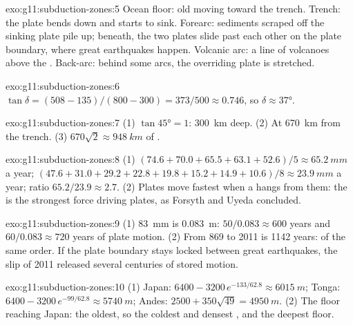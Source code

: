 \begin{solution}{exo:g11:subduction-zones:5}
Ocean floor: old  moving toward the trench. Trench: the plate bends
down and starts to sink. Forearc: sediments scraped off the sinking plate pile
up; beneath, the two plates slide past each other on the plate boundary,
where great earthquakes happen. Volcanic arc: a line of volcanoes above the
. Back-arc: behind some arcs, the overriding plate is stretched.
\end{solution}

\begin{solution}{exo:g11:subduction-zones:6}
$\tan\delta = (508 - 135)/(800 - 300) = 373/500 \approx 0.746$, so
$\delta \approx \ang{37}$.
\end{solution}

\begin{solution}{exo:g11:subduction-zones:7}
(1) $\tan\ang{45} = 1$: \qty{300}{km} deep. (2) At \qty{670}{km} from the
trench. (3) $670\sqrt{2} \approx \qty{948}{km}$ of .
\end{solution}

\begin{solution}{exo:g11:subduction-zones:8}
(1) $(74.6 + 70.0 + 65.5 + 63.1 + 52.6)/5 \approx \qty{65.2}{mm}$ a year;
$(47.6 + 31.0 + 29.2 + 22.8 + 19.8 + 15.2 + 14.9 + 10.6)/8 \approx
\qty{23.9}{mm}$ a year; ratio $65.2/23.9 \approx 2.7$. (2) Plates move
fastest when a  hangs from them: the  is the
strongest force driving plates, as Forsyth and Uyeda concluded.
\end{solution}

\begin{solution}{exo:g11:subduction-zones:9}
(1) \qty{83}{mm} is \qty{0.083}{m}: $50/0.083 \approx 600$ years and
$60/0.083 \approx 720$ years of plate motion. (2) From 869 to 2011 is 1142
years: of the same order. If the plate boundary stays locked between great
earthquakes, the slip of 2011 released several centuries of stored motion.
\end{solution}

\begin{solution}{exo:g11:subduction-zones:10}
(1) Japan: $6400 - 3200\,e^{-133/62.8} \approx \qty{6015}{m}$; Tonga:
$6400 - 3200\,e^{-99/62.8} \approx \qty{5740}{m}$; Andes:
$2500 + 350\sqrt{49} = \qty{4950}{m}$. (2) The floor reaching Japan: the
oldest, so the coldest and densest , and the deepest floor.
\end{solution}


